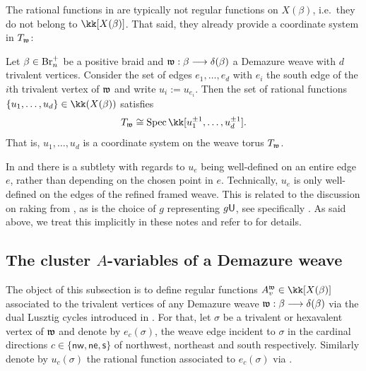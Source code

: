 \noindent The rational functions in  are typically not regular functions on $X(\beta)$, i.e.~they do not belong to $\kk[X(\beta)]$. That said, they already provide a coordinate system in $T_{\mathfrak{w}}$:

\begin{lemma}\label{lem:rational_functions_from_weave_vertices}
Let $\beta\in\mbox{Br}_n^+$ be a positive braid and $\mathfrak{w}:\beta\longrightarrow\delta(\beta)$ a Demazure weave with $d$ trivalent vertices. Consider the set of edges $e_1,\ldots,e_d$ with $e_i$ the south edge of the $i$th trivalent vertex of $\mathfrak{w}$ and write $u_i:=u_{e_i}$. Then the set of rational functions $\{u_1,\ldots,u_d\}\in\kk(X(\beta))$ satisfies
$$T_\w\cong \Spec\kk[u_1^{\pm1},\ldots,u_d^{\pm1}].$$
That is, $u_1,\ldots,u_d$ is a coordinate system on the weave torus $T_{\mathfrak{w}}$.
\end{lemma}

\begin{remark}
In  and  there is a subtlety with regards to $u_e$ being well-defined on an entire edge $e$, rather than depending on the chosen point in $e$. Technically, $u_e$ is only well-defined on the edges of the refined framed weave. This is related to the discussion on raking from \cite[Section 5]{CGGLSS25}, as is the choice of $g$ representing $g\mathsf{U}$, see specifically \cite[Definition 5.8.(5)]{CGGLSS25}. As said above, we treat this implicitly in these notes and refer to \cite{CGGLSS25} for details.\sbs
\end{remark}

\subsection{The cluster $A$-variables of a Demazure weave}\label{ssec:cluster_Avariables_weave} The object of this subsection is to define regular functions $A^\w_v\in\kk[X(\beta)]$ associated to the trivalent vertices of any Demazure weave $\mathfrak{w}:\beta\longrightarrow\delta(\beta)$ via the dual Lusztig cycles introduced in . For that, let $\sigma$ be a trivalent or hexavalent vertex of $\mathfrak{w}$ and denote by $e_{c}(\sigma)$, the weave edge incident to $\sigma$ in the cardinal directions $c\in\{\mathsf{nw},\mathsf{ne},\mathsf{s}\}$ of northwest, northeast and south respectively. Similarly denote by $u_{c}(\sigma)$ the rational function associated to $e_{c}(\sigma)$ via .

